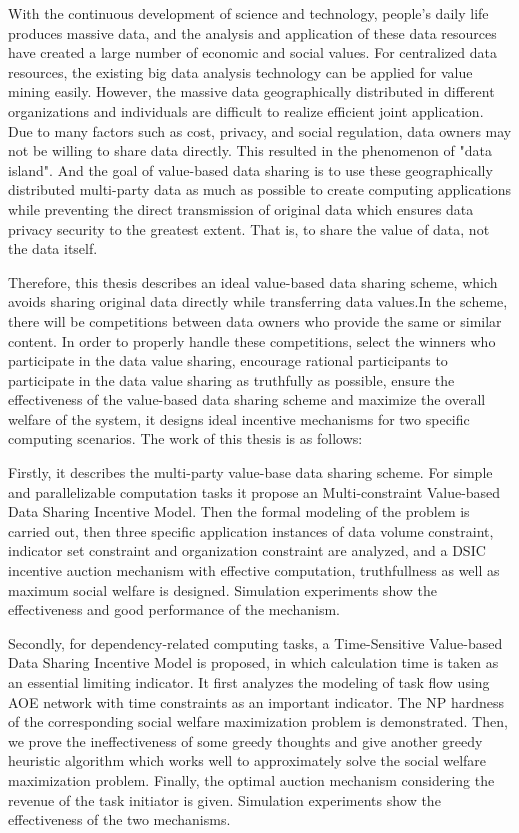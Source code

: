 \documentclass[promaster]{thesis-uestc}
\begin{document}
\begin{englishabstract}
With the continuous development of science and technology, people's daily life produces massive data, and the analysis and application of these data resources have created a large number of economic and social values. For centralized data resources, the existing big data analysis technology can be applied for value mining easily. However, the massive data geographically distributed in different organizations and individuals are difficult to realize efficient joint application.  Due to many factors such as cost, privacy, and social regulation, data owners may not be willing to share data directly.  This resulted in the phenomenon of "data island". And the goal of value-based data sharing is to use these geographically distributed multi-party data as much as possible to create computing applications while preventing the direct transmission of original data which ensures data privacy security to the greatest extent. That is, to share the value of data, not the data itself.

Therefore, this thesis describes an ideal value-based data sharing scheme, which avoids sharing original data directly while transferring data values.In the scheme, there will be competitions between data owners who provide the same or similar content. In order to properly handle these competitions, select the winners who participate in the data value sharing, encourage rational participants to participate in the data value sharing as truthfully as possible, ensure the effectiveness of the value-based data sharing scheme and maximize the overall welfare of the system, it designs ideal incentive mechanisms for two specific computing scenarios. The work of this thesis is as follows:

Firstly, it describes the multi-party value-base data sharing scheme.  For simple and parallelizable computation tasks it propose an Multi-constraint Value-based Data Sharing Incentive Model. Then the formal modeling of the problem is carried out, then three specific application instances of data volume constraint, indicator set constraint and organization constraint are analyzed, and a DSIC incentive auction mechanism with effective computation, truthfullness as well as maximum social welfare is designed.  Simulation experiments show the effectiveness and good performance of the mechanism.

Secondly, for dependency-related computing tasks, a Time-Sensitive Value-based Data Sharing Incentive Model is proposed, in which calculation time is taken as an essential limiting indicator. It first analyzes the modeling of task flow using AOE network with time constraints as an important indicator.  The NP hardness of the corresponding social welfare maximization problem is demonstrated.  Then, we prove the ineffectiveness of some greedy thoughts and give another greedy heuristic algorithm which works well to approximately solve the social welfare maximization problem.  Finally, the optimal auction mechanism considering the revenue of the task initiator is given.  Simulation experiments show the effectiveness of the two mechanisms.


\end{englishabstract}
\end{document}
